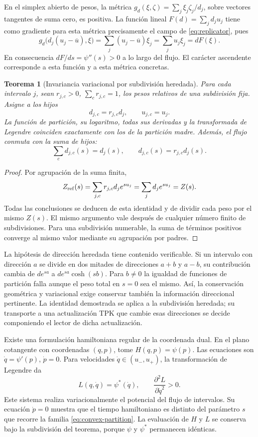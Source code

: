 \documentclass[a4paper,10pt]{article}
\newtheorem{theorem}{Teorema}[section]
\theoremstyle{definition}\newtheorem{definition}[theorem]{Definición}
\theoremstyle{remark}\newtheorem{remark}[theorem]{Observación}
\numberwithin{equation}{section}
\begin{document}
En el simplex abierto de pesos, la métrica
\(g_d(\xi,\zeta)=\sum_j\xi_j\zeta_j/d_j\), sobre vectores tangentes
de suma cero, es positiva. La función lineal
\(F(d)=\sum_jd_ju_j\) tiene como gradiente para esta métrica
precisamente el campo de \eqref{eq:replicator}, pues
\[
 g_d\bigl(d_j(u_j-\overline u),\xi\bigr)
 =\sum_j(u_j-\overline u)\xi_j=\sum_ju_j\xi_j=dF(\xi).
\]
En consecuencia \(dF/ds=\psi''(s)>0\) a lo largo del flujo. El
carácter ascendente corresponde a esta función y a esta métrica concretas.

\begin{theorem}[Invariancia variacional por subdivisión heredada]
Para cada intervalo \(j\), sean \(r_{j,c}>0\),
\(\sum_c r_{j,c}=1\), los pesos relativos de una subdivisión fija.
Asigne a los hijos
\[
 d_{j,c}=r_{j,c}d_j,\qquad u_{j,c}=u_j.
\]
La función de partición, su logaritmo, todas sus derivadas y la transformada
de Legendre coinciden exactamente con los de la partición madre.
Además, el flujo conmuta con la suma de hijos:
\[
 \sum_c d_{j,c}(s)=d_j(s),\qquad
 d_{j,c}(s)=r_{j,c}d_j(s).
\]
\end{theorem}
\begin{proof}
Por agrupación de la suma finita,
\[
 Z_{\rm ref}(s)=\sum_{j,c}r_{j,c}d_j e^{su_j}
 =\sum_j d_j e^{su_j}=Z(s).
\]
Todas las conclusiones se deducen de esta identidad y de dividir cada
peso por el mismo \(Z(s)\). El mismo argumento vale después de cualquier
número finito de subdivisiones. Para una subdivisión numerable, la suma de
términos positivos converge al mismo valor mediante su agrupación por padres.
\end{proof}

La hipótesis de dirección heredada tiene contenido verificable. Si un
intervalo con dirección \(a\) se divide en dos mitades de direcciones
\(a+b\) y \(a-b\), su contribución cambia de
\(d e^{sa}\) a \(d e^{sa}\cosh(sb)\). Para \(b\ne0\) la igualdad
de funciones de partición falla aunque el peso total en \(s=0\) sea
el mismo. Así, la conservación geométrica y variacional exige conservar
también la información direccional pertinente. La identidad demostrada
se aplica a la subdivisión heredada; su transporte a una actualización
TPK que cambie esas direcciones se decide componiendo el lector de dicha
actualización.

Existe una formulación hamiltoniana regular de la coordenada dual. En el
plano cotangente con coordenadas \((q,p)\), tome
\(H(q,p)=\psi(p)\). Las ecuaciones son
\(\dot q=\psi'(p)\), \(\dot p=0\). Para velocidades
\(\dot q\in(u_-,u_+)\), la transformación de Legendre da
\[
 L(q,\dot q)=\psi^*(\dot q),\qquad
 \frac{\partial^2L}{\partial\dot q^2}>0.
\]
Este sistema realiza variacionalmente el potencial del flujo de intervalos.
Su ecuación \(\dot p=0\) muestra que el tiempo hamiltoniano es distinto
del parámetro \(s\) que recorre la familia \eqref{eq:convex-partition}.
La evaluación de \(H\) y \(L\) se conserva bajo la subdivisión del
teorema, porque \(\psi\) y \(\psi^*\) permanecen idénticas.
\end{document}
